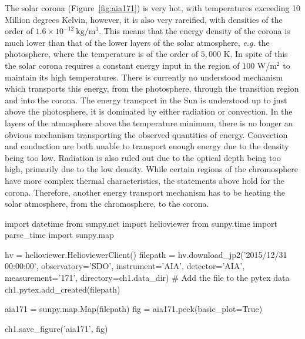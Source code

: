 The solar corona (Figure~\ref{fig:aia171}) is very hot, with temperatures exceeding 10 Million degrees Kelvin, however, it is also very rareified, with densities of the order of $1.6\times10^{-12}\ \text{kg}/\text{m}^3$.
This means that the energy density of the corona is much lower than that of the lower layers of the solar atmosphere, \textit{e.g.} the photosphere, where the temperature is of the order of $5,000$ K.
In spite of this the solar corona requires a constant energy input in the region of $100$ W/m$^2$ to maintain its high temperatures.
There is currently no understood mechanism which transports this energy, from the photosphere, through the transition region and into the corona.
The energy transport in the Sun is understood up to just above the photosphere, it is dominated by either radiation or convection.
In the layers of the atmosphere above the temperature minimum, there is no longer an obvious mechanism transporting the observed quantities of energy.
Convection and conduction are both unable to transport enough energy due to the density being too low.
Radiation is also ruled out due to the optical depth being too high, primarily due to the low density.
While certain regions of the chromosphere have more complex thermal characteristics, the statements above hold for the corona.
Therefore, another energy transport mechanism has to be heating the solar atmosphere, from the chromosphere, to the corona.


\begin{pycode}[chapter1]
import datetime
from sunpy.net import helioviewer
from sunpy.time import parse_time
import sunpy.map

hv = helioviewer.HelioviewerClient()
filepath = hv.download_jp2('2015/12/31 00:00:00', observatory='SDO',
													 instrument='AIA', detector='AIA', measurement='171',
													 directory=ch1.data_dir)
# Add the file to the pytex data
ch1.pytex.add_created(filepath)

aia171 = sunpy.map.Map(filepath)
fig = aia171.peek(basic_plot=True)


ch1.save_figure('aia171', fig)
\end{pycode}

